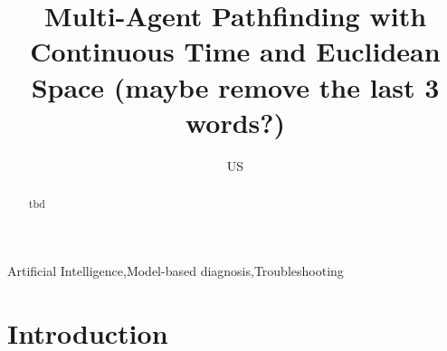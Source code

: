 \documentclass[review]{elsarticle}
\begin{document}
\begin{frontmatter}

\title{Multi-Agent Pathfinding with Continuous Time and Euclidean Space (maybe remove the last 3 words?)}


\author{US}
\address{The Department of Software and Information Systems Engineering\\
Ben Gurion University of the Negev}






\begin{abstract}
tbd 
\end{abstract}

\begin{keyword}
Artificial Intelligence\sep Model-based diagnosis\sep Troubleshooting
\end{keyword}

\end{frontmatter}

\linenumbers



\section{Introduction}

\end{document}
